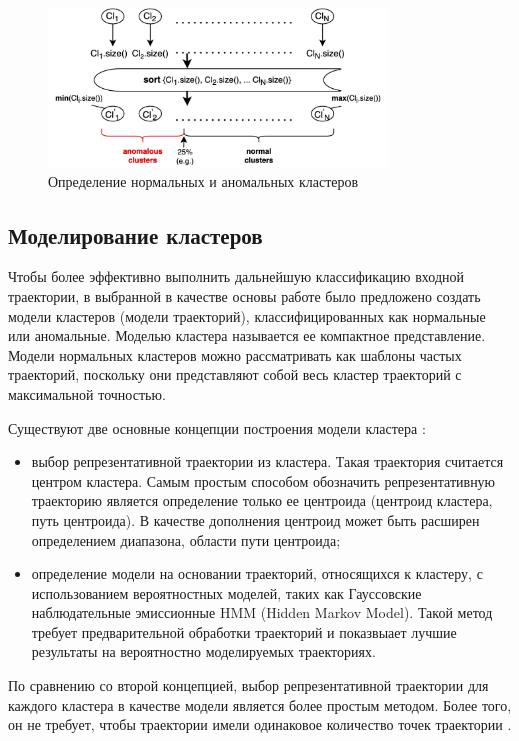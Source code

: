 \begin{figure}[!htb]
	\centering{}
	\includegraphics[width=0.8\textwidth]{images/cl-classif.png}
	\caption{Определение нормальных и аномальных кластеров}
	\label{fig:cl-classif}
\end{figure}

\subsection{Моделирование кластеров}

Чтобы более эффективно выполнить дальнейшую классификацию входной траектории, в выбранной в качестве основы работе было предложено создать модели кластеров (модели траекторий), классифицированных как нормальные или аномальные. Моделью кластера называется ее компактное представление. Модели нормальных кластеров можно рассматривать как шаблоны частых траекторий, поскольку они представляют собой весь кластер траекторий с максимальной точностью.

Существуют две основные концепции построения модели кластера \cite{article:surv_cl_models}:
\begin{itemize}
	\setlength\itemsep{-0.5em}
	\item выбор репрезентативной траектории из кластера. Такая траектория считается центром кластера. Самым простым способом обозначить репрезентативную траекторию является определение только ее центроида (центроид кластера, путь центроида). В качестве дополнения центроид может быть расширен определением диапазона, области пути центроида;
	\item определение модели на основании траекторий, относящихся к кластеру, с использованием вероятностных моделей, таких как Гауссовские наблюдательные эмиссионные HMM (Hidden Markov Model). Такой метод требует предварительной обработки траекторий и показвыает лучшие результаты на вероятностно моделируемых траекториях.
\end{itemize}

По сравнению со второй концепцией, выбор репрезентативной траектории для каждого кластера в качестве модели является более простым методом. Более того, он не требует, чтобы траектории имели одинаковое количество точек траектории \cite{inproceedings:7_related_work}.

